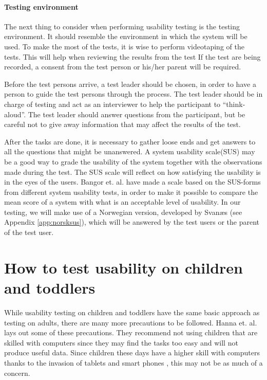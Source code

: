 \paragraph{Testing environment}
\label{par:testingenvironment}
The next thing to consider when performing usability testing is the testing environment. It should resemble the environment in which the system will be used. To make the most of the tests, it is wise to perform videotaping of the tests. This will help when reviewing the results from the test If the test are being recorded, a consent from the test person or his/her parent will be required.

Before the test persons arrive, a test leader should be chosen, in order to have a person to guide the test persons through the process. The test leader should be in charge of testing and act as an interviewer to help the participant to ``think-aloud''\cite{lewis1982using}. The test leader should answer questions from the participant, but be careful not to give away information that may affect the results of the test.

After the tasks are done, it is necessary to gather loose ends and get answers to all the questions that might be unanswered. A system usability scale(SUS)\cite{sus} may be a good way to grade the usability of the system together with the observations made during the test. The SUS scale will reflect on how satisfying the usability is in the eyes of the users. Bangor et. al. \cite{susform} have made a scale based on the SUS-forms from different system usability tests, in order to make it possible to compare the mean score of a system with what is an acceptable level of usability. In our testing, we will make use of a Norwegian version, developed by Svan\ae s (see Appendix \ref{app:norsksus}), which will be answered by the test users or the parent of the test user.

\section{How to test usability on children and toddlers}
\label{sec:usabilitytestchildren}
While usability testing on children and toddlers have the same basic approach as testing on adults, there are many more precautions to be followed. 
Hanna et. al. \cite{testingenvironmentforchildren} lays out some of these precautions. They recommend not using children that are skilled with computers since they may find the tasks too easy and will not produce useful data. 
Since children these days have a higher skill with computers thanks to the invasion of tablets and smart phones \cite{babiesusageoftablets}, this may not be as much of a concern. 

